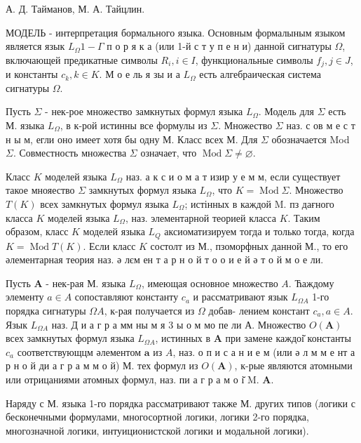 \documentclass[10pt]{article}
\begin{document}
А. Д. Тайманов, М. А. Тайцлин.



МОДЕЛЬ - интерпретация бормального языка. Основным формалыным языком является язык $L_{\Omega} 1-\Gamma$ п о р я к а (или 1-й с т у п е н и) данной сигнатуры $\Omega$, включающей предикатные символы $R_{i}, i \in I$, функциональные символы $f_{j}, j \in J$, и константы $c_{k}, k \in K$. М о е ль я зы и а $L_{\Omega}$ есть алгебраическая система сигнатуры $\Omega$.



Пусть $\Sigma$ - нек-рое множество замкнутых формул языка $L_{\Omega}$. Модель для $\Sigma$ есть М. языка $L_{\Omega}$, в к-рой истинны все формулы из $\Sigma$. Множество $\Sigma$ наз. с ов м е с т н ы м, егли оно имеет хотя бы одну М. Класс всех М. Для $\Sigma$ обозначается Mod $\Sigma$. Совместность множества $\Sigma$ означает, что $\operatorname{Mod} \Sigma \neq \varnothing$.



Класс $K$ моделей языка $L_{\Omega}$ наз. а к с и о м а т изир у е м м, если существует такое мнояество $\Sigma$ замкнутых формул языка $L_{\Omega}$, что $K=\operatorname{Mod} \Sigma$. Множество $T(K)$ всех замкнутых формул языка $L_{\Omega}$; истінных в каждой M. пз дағного класса $K$ моделей языка $L_{\Omega}$, наз. элементарной теорией класса $K$. Таким образом, класс $K$ моделей языка $L_{Q}$ аксиоматизируем тогда и только тогда, когда $K=\operatorname{Mod} T(K)$. Если класс $K$ состолт из М., пзоморфных данной М., то его әлементарная теория наз. ә лєм ен т а р н о й т о о и е й ә т о й м о е ли.



Пусть $\boldsymbol{A}$ - нек-рая М. языка $L_{\Omega}$, имеющая основное множество $A$. Ћаждому элементу $a \in A$ сопоставляют константу $c_{a}$ и рассматривают язык $L_{\Omega A}$ 1-го порядка сигнатуры $\Omega A$, к-рая получается из $\Omega$ добав- лением констант $c_{a}, a \in A$. Язык $L_{\Omega A}$ наз. Д и а г р а мм ны м я 3 ы о м мо пе ли А. Множество $O(\boldsymbol{A})$ всех замкнутых формул языка $L_{\Omega A}$, истинных в $\boldsymbol{A}$ при замене каждоі̆ константы $c_{a}$ соответствующцм әлементом $\boldsymbol{a}$ из $A$, наз. о п и с а н и е м (или ә л м м е нт а р н о й ди а г р а м м о й) М. тех формул из $O(\boldsymbol{A})$, к-рые являются атомными или отрицаниями атомных формул, наз. пи а г р а м о і̆ M. $\boldsymbol{A}$.



Наряду с М. языка 1-го порядка рассматривают также М. других типов (логики с бесконечными формулами, многосортной логики, логики 2-го порядка, многозначной логики, интуиционистской логики и модальной логики).
\end{document}
